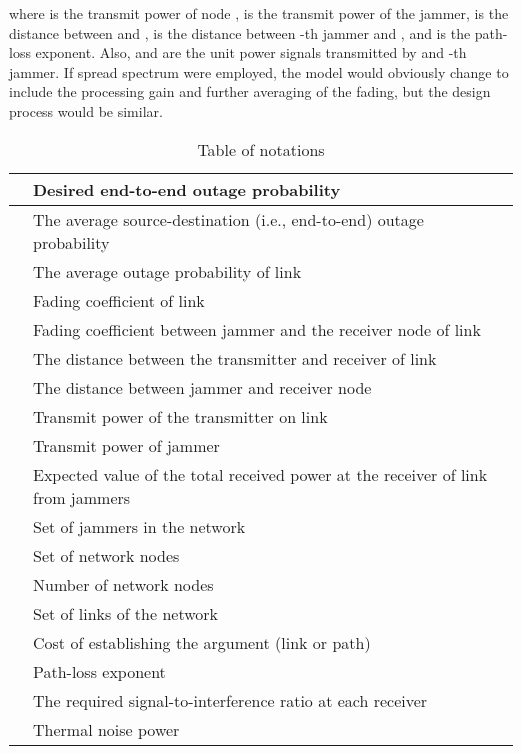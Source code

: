 \documentclass[10pt,journal]{IEEEtran}
\theoremstyle{definition}
\begin{document}
where   is the transmit power of node ,  is the transmit power of the  jammer,   is the distance between   and ,  is the distance between  -th jammer and , and  is the path-loss exponent.
Also,  and  are the unit power signals transmitted by  and -th jammer.
If spread spectrum were employed, the model would obviously change to include the processing gain and further averaging of the fading, but the design process would be similar. 
\begin{small}
\renewcommand{\arraystretch}{1.5}
\begin{table}
	\begin{center}
	\caption{Table of notations}\label{tab:1}
		\begin{tabular}[c]{|l| p{7.2cm}|}
		\hline
		& Desired end-to-end outage probability   \\
		\hline
		&The average source-destination (i.e., end-to-end) outage probability\\
		\hline
		&The average outage probability of   link\\
		\hline
		 & Fading coefficient of   link   \\
		\hline
		 & Fading coefficient between  jammer and   the receiver node of link    \\
		\hline
		 & The distance between the transmitter and receiver of link   \\
		\hline
		 & The distance between  jammer and   receiver node   \\
		\hline
		& Transmit power of  the  transmitter on  link \\
		\hline
			&Transmit power of  jammer\\
			\hline
			&Expected value of the total received power at the receiver of link  from jammers\\
			\hline
			&Set of jammers in the network\\
			\hline
			&Set of network nodes\\
			\hline
			&Number of network nodes\\
			\hline
			&Set of  links of the network \\
			\hline
			&Cost of establishing the argument (link or path)\\
			\hline
		&Path-loss exponent  \\
		\hline
			& The required signal-to-interference ratio at each receiver\\
			\hline
			&Thermal noise power\\
			\hline
		\end{tabular}
\end{center}
	\end{table}
	\end{small}
\end{document}
